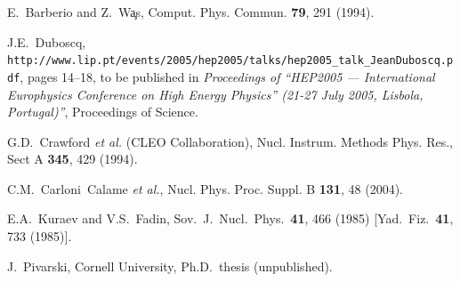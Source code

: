 \documentclass[aps,prd,preprint,superscriptaddress,tightenlines,nofootinbib]{revtex4}
\begin{document}
\begin{thebibliography}{99}
E.~Barberio and Z.~W\c{a}s, Comput. Phys. Commun. {\bf 79}, 291 (1994).

J.E.~Duboscq, {\tt http://www.lip.pt/events/2005/hep2005/talks/hep2005\_talk\_JeanDuboscq.pdf},
pages 14--18, to be published in {\sl Proceedings of ``HEP2005 ---
International Europhysics Conference on High Energy Physics'' (21-27
July 2005, Lisbola, Portugal)''}, Proceedings of Science.

G.D.~Crawford {\it et al.} (CLEO Collaboration),
Nucl. Instrum. Methods Phys. Res., Sect A {\bf 345}, 429 (1994).

C.M.~Carloni~Calame {\sl et al.},
Nucl. Phys. Proc. Suppl. B {\bf 131}, 48 (2004).

E.A.~Kuraev and V.S.~Fadin,
Sov.\ J.\ Nucl.\ Phys.\  {\bf 41}, 466 (1985)
[Yad.\ Fiz.\  {\bf 41}, 733 (1985)].

J.~Pivarski, Cornell University, Ph.D.~thesis (unpublished).

\end{thebibliography}
\end{document}
